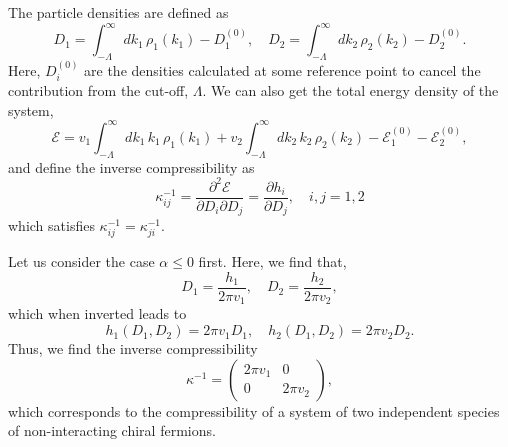 \documentclass[aps,pra,
superscriptaddress,
reprint,twocolumn,preprintnumbers,
amsmath,amssymb,
nofootinbib]{revtex4-1}
\begin{document}
The particle densities are defined as
        \begin{equation}
        D_1 = \int_{-\Lambda}^{\infty} dk_1 \,\rho_1(k_1)- D_1^{(0)}, \quad D_2 = \int_{-\Lambda}^{\infty} d k_2\,\rho_2(k_2) - D_2^{(0)}.
        \end{equation}
Here, $D_i^{(0)}$ are the densities calculated at some reference point to cancel the contribution from the cut-off, $\Lambda$. We can also get the total energy density of the system, 
        \begin{equation}
        \mathcal{E} = v_1 \int_{-\Lambda}^{\infty} d k_1\,k_1 \,\rho_1(k_1) + v_2 \int_{-\Lambda}^{\infty} d k_2\, k_2 \,\rho_2(k_2) - \mathcal{E}_1^{(0)} - \mathcal{E}_2^{(0)},
        \end{equation}
and define the inverse compressibility as
        \begin{equation}
        \kappa_{ij}^{-1} = \frac{\partial^2 \mathcal{E}}{\partial D_i \partial D_j} = \frac{\partial h_i}{\partial D_j}, \quad i,j = 1,2
        \end{equation}
which satisfies $\kappa_{ij}^{-1} = \kappa_{ji}^{-1}$.

Let us consider the case $\alpha\leq 0$ first. Here, we find that,
        \begin{equation}
        D_1 = \frac{h_1}{2\pi v_1}, \quad D_2 = \frac{h_2}{2 \pi v_2},
        \end{equation}
which when inverted leads to
        \begin{equation}
        h_1(D_1,D_2) = 2 \pi v_1 D_1, \quad h_2(D_1,D_2) = 2 \pi v_2 D_2.
        \end{equation}
Thus, we find the inverse compressibility
        \begin{equation}
        \kappa^{-1} = \left( 
        \begin{array}{cc}
         2\pi v_1 & 0 \\
         0 & 2\pi v_2
        \end{array} \right),
        \end{equation}
which corresponds to the compressibility of a system of two independent species of non-interacting chiral fermions. 
\end{document}
